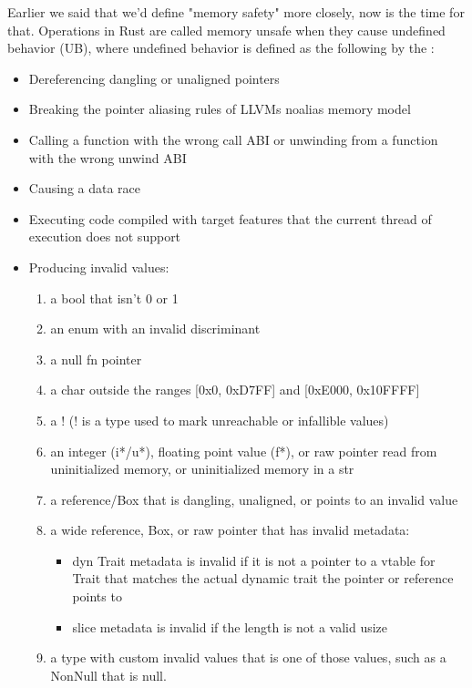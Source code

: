 Earlier we said that we'd define "memory safety" more closely, now is the time for that.
Operations in Rust are called memory unsafe when they cause undefined behavior (UB),
where undefined behavior is defined as the following by the \cite{Rustonomicon}:
\begin{itemize}
    \item Dereferencing dangling or unaligned pointers
    \item Breaking the pointer aliasing rules of LLVMs noalias memory model
    \item Calling a function with the wrong call ABI or unwinding from a function with the wrong unwind ABI
    \item Causing a data race
    \item Executing code compiled with target features that the current thread of execution does not support
    \item Producing invalid values:
          \begin{enumerate}
              \item a bool that isn't 0 or 1
              \item an enum with an invalid discriminant
              \item a null fn pointer
              \item a char outside the ranges [0x0, 0xD7FF] and [0xE000, 0x10FFFF]
              \item a ! (! is a type used to mark unreachable or infallible values)
              \item an integer (i*/u*), floating point value (f*), or raw pointer read from uninitialized memory, or uninitialized memory in a str
              \item a reference/Box that is dangling, unaligned, or points to an invalid value
              \item a wide reference, Box, or raw pointer that has invalid metadata:
                    \begin{itemize}
                        \item dyn Trait metadata is invalid if it is not a pointer to a vtable for Trait that matches the actual dynamic trait the pointer or reference points to
                        \item slice metadata is invalid if the length is not a valid usize
                    \end{itemize}
              \item a type with custom invalid values that is one of those values, such as a NonNull that is null.
          \end{enumerate}
\end{itemize}

